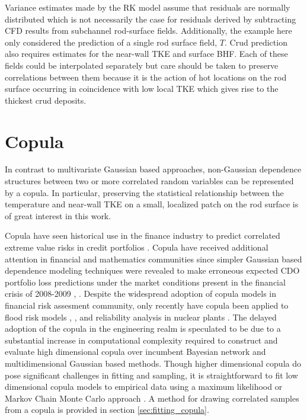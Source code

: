 Variance estimates made by the RK model assume that residuals are normally distributed which is not necessarily the case for residuals derived by subtracting CFD results from subchannel rod-surface fields.  Additionally, the example here only considered the prediction of a single rod surface field, $T$.  Crud prediction also requires estimates for the near-wall TKE and surface BHF.  Each of these fields could be interpolated separately but care should be taken to preserve correlations between them because it is the action of hot locations on the rod surface occurring in coincidence with low local TKE which gives rise to the thickest crud deposits.  


\section{Copula}

In contrast to multivariate Gaussian based approaches, non-Gaussian dependence structures between two or more correlated random variables can be represented by a copula.  In particular, preserving the statistical relationship between the temperature and near-wall TKE on a small, localized patch on the rod surface is of great interest in this work.

Copula have seen historical use in the finance industry to
predict correlated extreme value risks in credit portfolios
\cite{Geidosch2016}.  Copula have received additional attention in financial and mathematics communities since 
simpler Gaussian based dependence modeling techniques were revealed to make erroneous expected CDO portfolio loss predictions under the market conditions present in the financial crisis of
2008-2009 \cite{MacKenzie2013}, \cite{Li2000}.  Despite the widespread adoption of copula models in financial risk assesment community, only recently have copula been applied to flood risk
models \cite{Dupuis2007}, \cite{Ganguli2012}, and reliability analysis in nuclear plants
\cite{Kelly2007}.  The delayed adoption of the copula in the
engineering realm is speculated to be due to a substantial increase in computational
complexity required to construct and evaluate high dimensional copula over
incumbent Bayesian network and multidimensional Gaussian based methods.  
Though higher dimensional copula do pose significant challenges in fitting and sampling, it is straightforward to fit low dimensional copula models to empirical data
using a maximum likelihood or Markov Chain Monte Carlo approach \cite{Jouini1996}.
A method for drawing correlated samples from a copula is provided in section \ref{sec:fitting_copula}.
